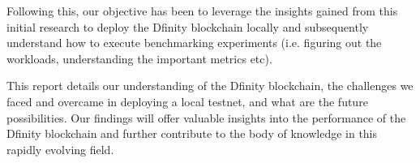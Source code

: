 Following this, our objective has been to leverage the insights gained from this initial research to deploy the Dfinity blockchain 
locally and subsequently understand how to execute benchmarking experiments (i.e. figuring out the workloads, understanding the 
important metrics etc).

This report details our understanding of the Dfinity blockchain, the challenges we faced and overcame in deploying a local testnet, 
and what are the future possibilities. Our findings will offer valuable insights into the performance of the Dfinity blockchain and 
further contribute to the body of knowledge in this rapidly evolving field.
